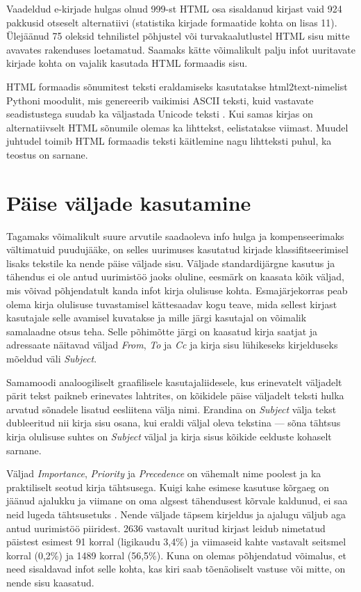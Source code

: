 \documentclass[]{trkuur}
\let\eng\emph
\begin{document}
Vaadeldud e-kirjade hulgas olnud 999-st HTML osa sisaldanud kirjast vaid 924
pakkusid otseselt alternatiivi (statistika kirjade formaatide kohta on lisas 11).
Ülejäänud 75 oleksid tehnilistel põhjustel
või turvakaalutlustel HTML sisu mitte avavates rakenduses loetamatud. Saamaks
kätte võimalikult palju infot uuritavate kirjade kohta on vajalik kasutada
HTML formaadis sisu.

HTML formaadis sõnumitest teksti eraldamiseks kasutatakse html2text-nimelist
Pythoni moodulit, mis genereerib vaikimisi ASCII teksti, kuid vastavate
seadistustega suudab ka väljastada Unicode teksti
\autocite{html2text}.
Kui samas kirjas on alternatiivselt HTML sõnumile olemas ka lihttekst,
eelistatakse viimast. Muudel juhtudel toimib HTML formaadis teksti käitlemine
nagu lihtteksti puhul, ka teostus on sarnane.

\section{Päise väljade kasutamine}
Tagamaks võimalikult suure arvutile saadaoleva info hulga ja kompenseerimaks
vältimatuid puudujääke, on selles uurimuses kasutatud kirjade klassifitseerimisel
lisaks tekstile ka nende päise väljade sisu. 
Väljade standardijärgne kasutus ja tähendus ei ole antud uurimistöö jaoks oluline,
eesmärk on kaasata kõik väljad, mis võivad põhjendatult kanda infot kirja olulisuse kohta.
Esmajärjekorras peab olema
kirja olulisuse tuvastamisel kättesaadav kogu teave, mida sellest kirjast
kasutajale selle avamisel kuvatakse ja mille järgi kasutajal on võimalik
samalaadne otsus teha. Selle põhimõtte järgi on kaasatud kirja saatjat ja
adressaate näitavad väljad \eng{From}, \eng{To} ja \eng{Cc} ja kirja sisu lühikeseks kirjelduseks
mõeldud väli \eng{Subject}.

Samamoodi analoogiliselt graafilisele kasutajaliidesele,
kus erinevatelt väljadelt pärit tekst paikneb erinevates lahtrites, on kõikidele
päise väljadelt teksti hulka arvatud sõnadele lisatud eesliitena välja nimi.
Erandina on \eng{Subject} välja tekst dubleeritud nii kirja sisu osana, kui eraldi
väljal oleva tekstina --- sõna tähtsus kirja olulisuse suhtes on \eng{Subject} väljal
ja kirja sisus kõikide eelduste kohaselt sarnane.

Väljad \eng{Importance}, \eng{Priority} ja \eng{Precedence}
on vähemalt nime poolest ja ka
praktiliselt seotud kirja tähtsusega. Kuigi kahe esimese kasutuse kõrgaeg
on jäänud ajalukku ja viimane on oma algsest tähendusest kõrvale kaldunud,
ei saa neid lugeda tähtsusetuks \autocite{FalkPrecedence}. Nende väljade täpsem kirjeldus ja ajalugu
väljub aga antud uurimistöö piiridest.
2636 vastavalt uuritud kirjast leidub nimetatud päistest esimest 91 korral (ligikaudu
3,4\%) ja
viimaseid kahte vastavalt seitsmel korral (0,2\%) ja 1489 korral (56,5\%). Kuna on
olemas põhjendatud võimalus, et need sisaldavad infot selle kohta, kas kiri
saab tõenäoliselt vastuse või mitte, on nende sisu kaasatud.
\end{document}

